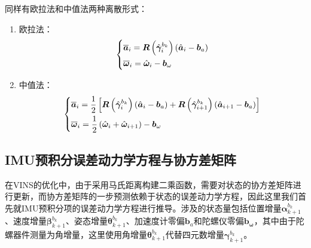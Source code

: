 同样有欧拉法和中值法两种离散形式：
\begin{enumerate}
	\item 欧拉法：
	\begin{equation}
	\centering
	\left\{
	\begin{aligned}
	&\overline{\bm{a}}_i=\bm{R}\left(\hat{\bm{\gamma}}_i^{b_k}\right)\left(\hat{\bm{a}}_i-\bm{b}_a\right)\\
	&\overline{\bm{\omega}}_i=\hat{\bm{\omega}}_i-\bm{b}_\omega
	\end{aligned}
	\right.
	\end{equation}
	\item 中值法：
	\begin{equation}
	\centering
	\left\{
	\begin{aligned}
	&\overline{\bm{a}}_i=\frac{1}{2}\left[\bm{R}\left(\hat{\bm{\gamma}}_i^{b_k}\right)\left(\hat{\bm{a}}_i-\bm{b}_a\right)+\bm{R}\left(\hat{\bm{\gamma}}_{i+1}^{b_k}\right)\left(\hat{\bm{a}}_{i+1}-\bm{b}_a\right)\right]\\
	&\overline{\bm{\omega}}_i=\frac{1}{2}\left(\hat{\bm{\omega}}_i+\hat{\bm{\omega}}_{i+1}\right)-\bm{b}_\omega
	\end{aligned}
	\right.
	\end{equation}
\end{enumerate}
\subsection{IMU预积分误差动力学方程与协方差矩阵}
在VINS的优化中，由于采用马氏距离构建二乘函数，需要对状态的协方差矩阵进行更新，而协方差矩阵的一步预测依赖于状态的误差动力学方程，因此这里我们首先就IMU预积分项的误差动力学方程进行推导。涉及的状态量包括位置增量$\bm{\alpha}_{k+1}^{b_k}$、速度增量$\bm{\beta}_{k+1}^{b_k}$、姿态增量$\bm{\theta}_{k+1}^{b_k}$、加速度计零偏$\bm{b}_a$和陀螺仪零偏$\bm{b_\omega}$，其中由于陀螺器件测量为角增量，这里使用角增量$\bm{\theta}_{k+1}^{b_k}$代替四元数增量$\bm{\gamma}_{k+1}^{b_k}$。
